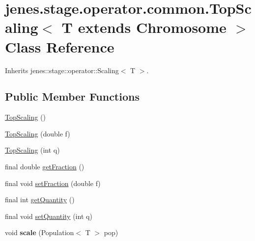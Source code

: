 \hypertarget{classjenes_1_1stage_1_1operator_1_1common_1_1_top_scaling_3_01_t_01extends_01_chromosome_01_4}{
\section{jenes.stage.operator.common.TopScaling$<$ T extends Chromosome $>$ Class Reference}
\label{classjenes_1_1stage_1_1operator_1_1common_1_1_top_scaling_3_01_t_01extends_01_chromosome_01_4}
}
Inherits jenes::stage::operator::Scaling$<$ T $>$.

\subsection*{Public Member Functions}
\begin{CompactItemize}
\item 
\hyperlink{classjenes_1_1stage_1_1operator_1_1common_1_1_top_scaling_3_01_t_01extends_01_chromosome_01_4_a1be76204f86d57efff77e708cbcf2f9}{TopScaling} ()
\item 
\hyperlink{classjenes_1_1stage_1_1operator_1_1common_1_1_top_scaling_3_01_t_01extends_01_chromosome_01_4_cb9c77ba5c63f60dcb5d27cf256c6d61}{TopScaling} (double f)
\item 
\hyperlink{classjenes_1_1stage_1_1operator_1_1common_1_1_top_scaling_3_01_t_01extends_01_chromosome_01_4_db3a002d09932e82a52f848cd4b8247e}{TopScaling} (int q)
\item 
final double \hyperlink{classjenes_1_1stage_1_1operator_1_1common_1_1_top_scaling_3_01_t_01extends_01_chromosome_01_4_4cb1be9e4948570a5f5d94ed97eb6cba}{getFraction} ()
\item 
final void \hyperlink{classjenes_1_1stage_1_1operator_1_1common_1_1_top_scaling_3_01_t_01extends_01_chromosome_01_4_b39c283ff0bb662ac76df11474ef133f}{setFraction} (double f)
\item 
final int \hyperlink{classjenes_1_1stage_1_1operator_1_1common_1_1_top_scaling_3_01_t_01extends_01_chromosome_01_4_165fa24c31055aecd832e837419bad6f}{getQuantity} ()
\item 
final void \hyperlink{classjenes_1_1stage_1_1operator_1_1common_1_1_top_scaling_3_01_t_01extends_01_chromosome_01_4_53e27151e7c9b0b98e5c80e5018d2800}{setQuantity} (int q)
\item 
\hypertarget{classjenes_1_1stage_1_1operator_1_1common_1_1_top_scaling_3_01_t_01extends_01_chromosome_01_4_fb5fd14e2cdb722a139193172c56ceaa}{
void \textbf{scale} (Population$<$ T $>$ pop)}
\label{classjenes_1_1stage_1_1operator_1_1common_1_1_top_scaling_3_01_t_01extends_01_chromosome_01_4_fb5fd14e2cdb722a139193172c56ceaa}

\end{CompactItemize}

